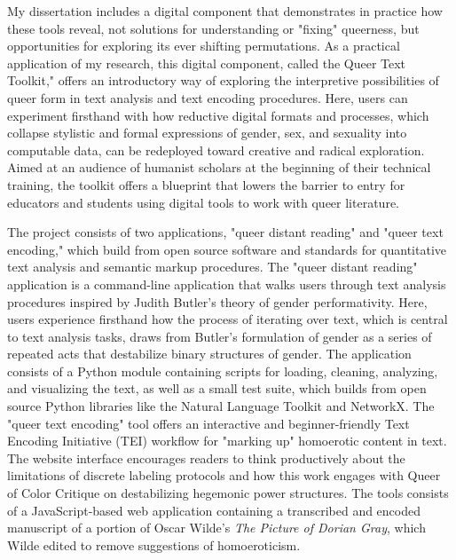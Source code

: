 \documentclass[11pt]{article}
\begin{document}
My dissertation includes a digital component that demonstrates in
practice how these tools reveal, not solutions for understanding or
"fixing" queerness, but opportunities for exploring its ever shifting
permutations. As a practical application of my research, this digital
component, called the Queer Text Toolkit," offers an introductory way
of exploring the interpretive possibilities of queer form in text
analysis and text encoding procedures. Here, users can experiment
firsthand with how reductive digital formats and processes, which
collapse stylistic and formal expressions of gender, sex, and
sexuality into computable data, can be redeployed toward creative and
radical exploration. Aimed at an audience of humanist scholars at the
beginning of their technical training, the toolkit offers a blueprint
that lowers the barrier to entry for educators and students using
digital tools to work with queer literature.

The project consists of two applications, "queer distant reading" and
"queer text encoding," which build from open source software and
standards for quantitative text analysis and semantic markup
procedures. The "queer distant reading" application is a command-line
application that walks users through text analysis procedures inspired
by Judith Butler’s theory of gender performativity. Here, users
experience firsthand how the process of iterating over text, which is
central to text analysis tasks, draws from Butler’s formulation of
gender as a series of repeated acts that destabilize binary structures
of gender. The application consists of a Python module containing
scripts for loading, cleaning, analyzing, and visualizing the text, as
well as a small test suite, which builds from open source Python
libraries like the Natural Language Toolkit and NetworkX. The "queer
text encoding" tool offers an interactive and beginner-friendly Text
Encoding Initiative (TEI) workflow for "marking up" homoerotic content
in text. The website interface encourages readers to think
productively about the limitations of discrete labeling protocols and
how this work engages with Queer of Color Critique on destabilizing
hegemonic power structures. The tools consists of a JavaScript-based
web application containing a transcribed and encoded manuscript of a
portion of Oscar Wilde’s \emph{The Picture of Dorian Gray}, which Wilde
edited to remove suggestions of homoeroticism.
\end{document}
